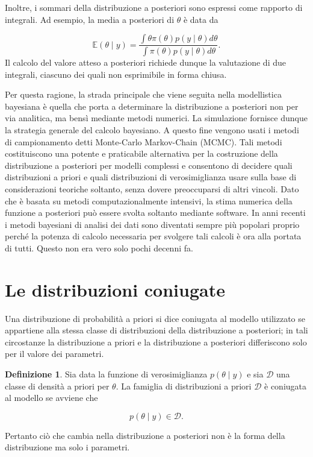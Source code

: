 \documentclass[
]{memoir}
\newcommand{\E}{\mathbb{E}} %
\theoremstyle{definition}
\newtheorem{definition}{Definizione}[chapter]
\theoremstyle{definition}
\theoremstyle{definition}
\theoremstyle{definition}
\theoremstyle{remark}
\begin{document}
Inoltre, i sommari della distribuzione a posteriori sono espressi come rapporto di integrali. Ad esempio, la media a posteriori di \(\theta\) è data da

\[
\E(\theta \mid y) = \frac{\int \theta \pi(\theta) p(y \mid \theta) d \theta}{\int \pi(\theta) p(y \mid \theta) d \theta}.
\]
Il calcolo del valore atteso a posteriori richiede dunque la valutazione di due integrali, ciascuno dei quali non esprimibile in forma chiusa.

Per questa ragione, la strada principale che viene seguita nella modellistica bayesiana è quella che porta a determinare la distribuzione a posteriori non per via analitica, ma bensì mediante metodi numerici. La simulazione fornisce dunque la strategia generale del calcolo bayesiano. A questo fine vengono usati i metodi di campionamento detti Monte-Carlo Markov-Chain (MCMC). Tali metodi costituiscono una potente e praticabile alternativa per la costruzione della distribuzione a posteriori per modelli complessi e consentono di decidere quali distribuzioni a priori e quali distribuzioni di verosimiglianza usare sulla base di considerazioni teoriche soltanto, senza dovere preoccuparsi di altri vincoli. Dato che è basata su metodi computazionalmente intensivi, la stima numerica della funzione a posteriori può essere svolta soltanto mediante software. In anni recenti i metodi bayesiani di analisi dei dati sono diventati sempre più popolari proprio perché la potenza di calcolo necessaria per svolgere tali calcoli è ora alla portata di tutti. Questo non era vero solo pochi decenni fa.

\hypertarget{le-distribuzioni-coniugate}{%
\section{Le distribuzioni coniugate}\label{le-distribuzioni-coniugate}}

Una distribuzione di probabilità a priori si dice coniugata al modello utilizzato se appartiene alla stessa classe di distribuzioni della distribuzione a posteriori; in tali circostanze la distribuzione a priori e la distribuzione a posteriori differiscono solo per il valore dei parametri.

\begin{definition}
Sia data la funzione di verosimiglianza \(p(\theta \mid y)\) e sia \(\mathcal{D}\) una classe di densità a priori per \(\theta\). La famiglia di distribuzioni a priori \(\mathcal{D}\) è coniugata al modello se avviene che

\[
p(\theta \mid y) \in \mathcal{D}.
\]

\noindent
Pertanto ciò che cambia nella distribuzione a posteriori non è la forma della distribuzione ma solo i parametri.
\end{definition}
\end{document}
